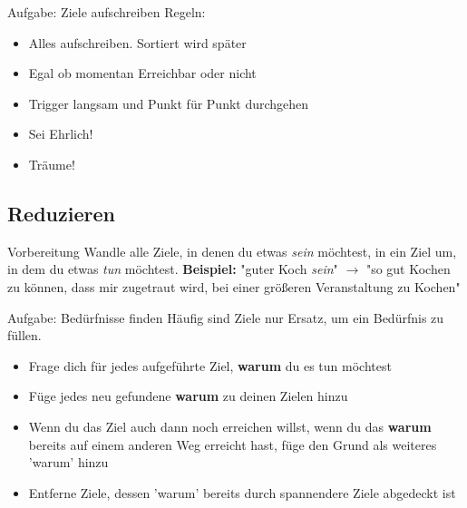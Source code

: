 \begin{frame}[c]
    \begin{block}{Aufgabe: Ziele aufschreiben}
    Regeln:
    \begin{itemize}
        \item Alles aufschreiben. Sortiert wird später
        \item Egal ob momentan Erreichbar oder nicht
        \item Trigger langsam und Punkt für Punkt durchgehen
        \item Sei Ehrlich!
        \item Träume!
    \end{itemize}
    \end{block}
\end{frame}



\subsection{Reduzieren}

\begin{frame}[c]{Vorbereitung}
    \large
    Wandle alle Ziele, in denen du etwas {\em sein} möchtest, in ein Ziel um,
    in dem du etwas {\em tun} möchtest. \newline \newline \pause
    \textbf{Beispiel:} "guter Koch {\em sein}" $\rightarrow$ "so gut Kochen zu
    können, dass mir zugetraut wird, bei einer größeren Veranstaltung zu Kochen"
\end{frame}

\begin{frame}[c]
    \normalsize
    \begin{block}{Aufgabe: Bedürfnisse finden}
    Häufig sind Ziele nur Ersatz, um ein Bedürfnis zu füllen.
    \begin{itemize}
        \item Frage dich für jedes aufgeführte Ziel, \textbf{warum} du es tun möchtest
        \item Füge jedes neu gefundene \textbf{warum} zu deinen Zielen hinzu
        \item Wenn du das Ziel auch dann noch erreichen willst, wenn du das
            \textbf{warum} bereits auf einem anderen Weg erreicht hast, füge
            den Grund als weiteres 'warum' hinzu
        \item Entferne Ziele, dessen 'warum' bereits durch spannendere Ziele abgedeckt ist
    \end{itemize}
    \end{block}
\end{frame}



